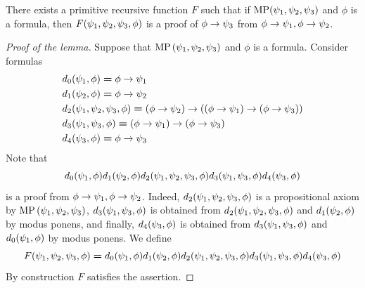 \documentclass[10pt]{amsart}
\newcommand{\meq}{\boldsymbol{=}}
\begin{document}
\begin{lemma}\label{lemma:case_of_modus_ponens}
  There exists a primitive recursive function $F$ such that if $\mathrm{MP}(\psi_{\rm{1}},\psi_{\rm{2}},\psi_{\rm{3}})$ and $\phi$ is a formula, then $F(\psi_{\rm{1}},\psi_{\rm{2}},\psi_{\rm{3}},\phi)$ is a proof of $\phi \rightarrow \psi_{\rm{3}}$ from $\phi \rightarrow \psi_{\rm{1}},\phi \rightarrow \psi_{\rm{2}}$.
\end{lemma}
\begin{proof}[Proof of the lemma]
  Suppose that $\mathrm{MP}\left(\psi_{\rm{1}},\psi_{\rm{2}},\psi_{\rm{3}}\right)$ and $\phi$ is a formula. Consider formulas
  \begin{align*}
    &d_{\rm{0}}(\psi_{\rm{1}},\phi) \meq \phi \ra \psi_{\rm{1}}\\
    &d_{\rm{1}}(\psi_{\rm{2}},\phi) \meq \phi \ra \psi_{\rm{2}}\\
    &d_{\rm{2}}(\psi_{\rm{1}},\psi_{\rm{2}},\psi_{\rm{3}},\phi) \meq \left(\phi \ra \psi_{\rm{2}}\right) \ra \left(\left(\phi \ra \psi_{\rm{1}}\right) \ra \left(\phi \ra \psi_{\rm{3}}\right)\right)\\
    &d_{\rm{3}}(\psi_{\rm{1}},\psi_{\rm{3}},\phi) \meq \left(\phi \ra \psi_{\rm{1}}\right) \ra \left(\phi \ra \psi_{\rm{3}}\right)\\
    &d_{\rm{4}}(\psi_{\rm{3}},\phi) \meq \phi \ra \psi_{\rm{3}}\\
  \end{align*}
  Note that 
  $$d_{\rm{0}}(\psi_{\rm{1}},\phi)d_{\rm{1}}(\psi_{\rm{2}},\phi)d_{\rm{2}}(\psi_{\rm{1}},\psi_{\rm{2}},\psi_{\rm{3}},\phi)d_{\rm{3}}(\psi_{\rm{1}},\psi_{\rm{3}},\phi)d_{\rm{4}}(\psi_{\rm{3}},\phi)$$
  is a proof from $\phi \rightarrow \psi_{\rm{1}},\phi \rightarrow \psi_{\rm{2}}$. Indeed, $d_{\rm{2}}(\psi_{\rm{1}},\psi_{\rm{2}},\psi_{\rm{3}},\phi)$ is a propositional axiom by $\mathrm{MP}\left(\psi_{\rm{1}},\psi_{\rm{2}},\psi_{\rm{3}}\right)$, $d_{\rm{3}}(\psi_{\rm{1}},\psi_{\rm{3}},\phi)$ is obtained from $d_{\rm{2}}(\psi_{\rm{1}},\psi_{\rm{2}},\psi_{\rm{3}},\phi)$ and $d_{\rm{1}}(\psi_{\rm{2}},\phi)$ by modus ponens, and finally, $d_{\rm{4}}(\psi_{\rm{3}},\phi)$ is obtained from $d_{\rm{3}}(\psi_{\rm{1}},\psi_{\rm{3}},\phi)$ and $d_{\rm{0}}(\psi_{\rm{1}},\phi)$ by modus ponens. We define
  $$F(\psi_{\rm{1}},\psi_{\rm{2}},\psi_{\rm{3}},\phi) \meq d_{\rm{0}}(\psi_{\rm{1}},\phi)d_{\rm{1}}(\psi_{\rm{2}},\phi)d_{\rm{2}}(\psi_{\rm{1}},\psi_{\rm{2}},\psi_{\rm{3}},\phi)d_{\rm{3}}(\psi_{\rm{1}},\psi_{\rm{3}},\phi)d_{\rm{4}}(\psi_{\rm{3}},\phi)$$
  By construction $F$ satisfies the assertion.
\end{proof}
\end{document}
